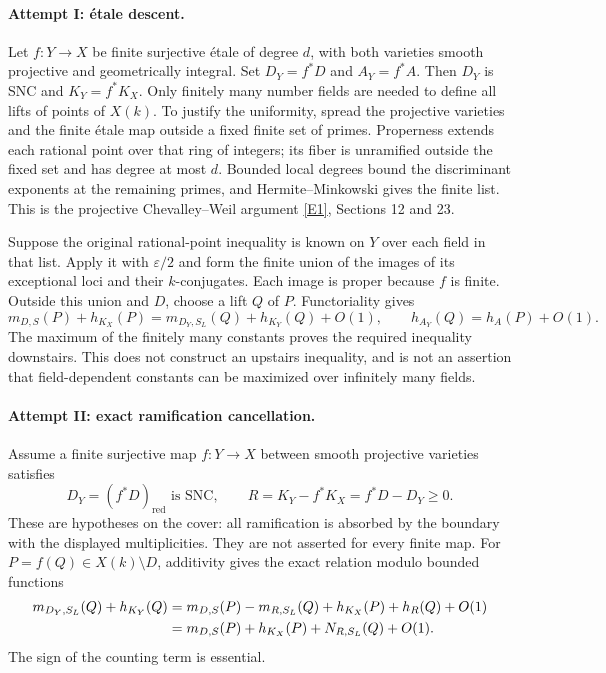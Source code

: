 \documentclass[11pt,a4paper]{article}
\newcommand{\eps}{\varepsilon}
\newcommand{\eref}[2]{\hyperlink{extra:#1:#2}{[E#2]}}
\numberwithin{equation}{section}
\begin{document}
\paragraph{Attempt I: étale descent.}
Let $f:Y\to X$ be finite surjective étale of degree $d$, with both varieties smooth projective and geometrically integral. Set $D_Y=f^*D$ and $A_Y=f^*A$. Then $D_Y$ is SNC and $K_Y=f^*K_X$. Only finitely many number fields are needed to define all lifts of points of $X(k)$. To justify the uniformity, spread the projective varieties and the finite étale map outside a fixed finite set of primes. Properness extends each rational point over that ring of integers; its fiber is unramified outside the fixed set and has degree at most $d$. Bounded local degrees bound the discriminant exponents at the remaining primes, and Hermite--Minkowski gives the finite list. This is the projective Chevalley--Weil argument \eref{statement}{1}, Sections 12 and 23.

Suppose the original rational-point inequality is known on $Y$ over each field in that list. Apply it with $\eps/2$ and form the finite union of the images of its exceptional loci and their $k$-conjugates. Each image is proper because $f$ is finite. Outside this union and $D$, choose a lift $Q$ of $P$. Functoriality gives
\[
 m_{D,S}(P)+h_{K_X}(P)
 =m_{D_Y,S_L}(Q)+h_{K_Y}(Q)+O(1),\qquad
 h_{A_Y}(Q)=h_A(P)+O(1).
\]
The maximum of the finitely many constants proves the required inequality downstairs. This does not construct an upstairs inequality, and is not an assertion that field-dependent constants can be maximized over infinitely many fields.

\paragraph{Attempt II: exact ramification cancellation.}
Assume a finite surjective map $f:Y\to X$ between smooth projective varieties satisfies
\begin{equation}\label{r64:cover}
 D_Y=(f^*D)_{\mathrm{red}}\text{ is SNC},\qquad
 R=K_Y-f^*K_X=f^*D-D_Y\ge0.
\end{equation}
These are hypotheses on the cover: all ramification is absorbed by the boundary with the displayed multiplicities. They are not asserted for every finite map. For $P=f(Q)\in X(k)\setminus D$, additivity gives the exact relation modulo bounded functions
\begin{align}
 m_{D_Y,S_L}(Q)+h_{K_Y}(Q)
 &=m_{D,S}(P)-m_{R,S_L}(Q)+h_{K_X}(P)+h_R(Q)+O(1)\notag\\
 &=m_{D,S}(P)+h_{K_X}(P)+N_{R,S_L}(Q)+O(1).
 \label{r64:identity}
\end{align}
The sign of the counting term is essential.
\end{document}
